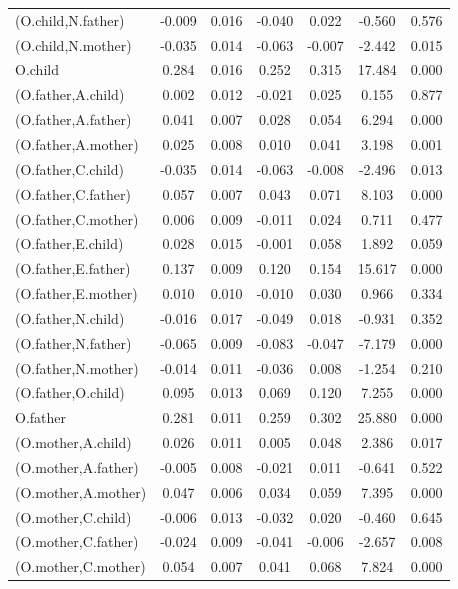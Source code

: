 \documentclass[11pt,a5paper,twoside]{book}
\begin{document}
{{\begin{center}
\begin{longtable}{@{\extracolsep{\fill}}lcccccc@{}}
   (O.child,N.father)  & -0.009 & 0.016 & -0.040 & 0.022 & -0.560 & 0.576 \\ 
   (O.child,N.mother)  & -0.035 & 0.014 & -0.063 & -0.007 & -2.442 & 0.015 \\ 
   O.child  & 0.284 & 0.016 & 0.252 & 0.315 & 17.484 & 0.000 \\ 
   (O.father,A.child)  & 0.002 & 0.012 & -0.021 & 0.025 & 0.155 & 0.877 \\ 
   (O.father,A.father)  & 0.041 & 0.007 & 0.028 & 0.054 & 6.294 & 0.000 \\ 
   (O.father,A.mother)  & 0.025 & 0.008 & 0.010 & 0.041 & 3.198 & 0.001 \\ 
   (O.father,C.child)  & -0.035 & 0.014 & -0.063 & -0.008 & -2.496 & 0.013 \\ 
   (O.father,C.father)  & 0.057 & 0.007 & 0.043 & 0.071 & 8.103 & 0.000 \\ 
   (O.father,C.mother)  & 0.006 & 0.009 & -0.011 & 0.024 & 0.711 & 0.477 \\ 
   (O.father,E.child)  & 0.028 & 0.015 & -0.001 & 0.058 & 1.892 & 0.059 \\ 
   (O.father,E.father)  & 0.137 & 0.009 & 0.120 & 0.154 & 15.617 & 0.000 \\ 
   (O.father,E.mother)  & 0.010 & 0.010 & -0.010 & 0.030 & 0.966 & 0.334 \\ 
   (O.father,N.child)  & -0.016 & 0.017 & -0.049 & 0.018 & -0.931 & 0.352 \\ 
   (O.father,N.father)  & -0.065 & 0.009 & -0.083 & -0.047 & -7.179 & 0.000 \\ 
   (O.father,N.mother)  & -0.014 & 0.011 & -0.036 & 0.008 & -1.254 & 0.210 \\ 
   (O.father,O.child)  & 0.095 & 0.013 & 0.069 & 0.120 & 7.255 & 0.000 \\ 
   O.father  & 0.281 & 0.011 & 0.259 & 0.302 & 25.880 & 0.000 \\ 
   (O.mother,A.child)  & 0.026 & 0.011 & 0.005 & 0.048 & 2.386 & 0.017 \\ 
   (O.mother,A.father)  & -0.005 & 0.008 & -0.021 & 0.011 & -0.641 & 0.522 \\ 
   (O.mother,A.mother)  & 0.047 & 0.006 & 0.034 & 0.059 & 7.395 & 0.000 \\ 
   (O.mother,C.child)  & -0.006 & 0.013 & -0.032 & 0.020 & -0.460 & 0.645 \\ 
   (O.mother,C.father)  & -0.024 & 0.009 & -0.041 & -0.006 & -2.657 & 0.008 \\ 
   (O.mother,C.mother)  & 0.054 & 0.007 & 0.041 & 0.068 & 7.824 & 0.000 \\ 

\end{longtable}
\end{center}}}
\end{document}
